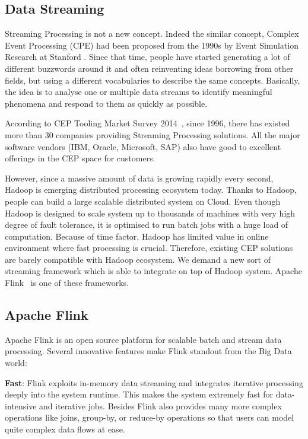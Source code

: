 \subsection*{Data Streaming}
Streaming Processing is not a new concept. Indeed the similar concept, Complex Event Processing (CPE) had been proposed from the 1990s by Event Simulation Research at Stanford \citep{Luckham:2001}. Since that time, people have started generating a lot of different buzzwords around it and often reinventing ideas borrowing from other fields, but using a different vocabularies to describe the same concepts. Basically, the idea is to analyse one or multiple data streams to identify meaningful phenomena and respond to them as quickly as possible. 


According to CEP Tooling Market Survey 2014~\citep{Paul:2014}, since 1996, there has existed more than 30 companies providing Streaming Processing solutions. All the major software vendors (IBM, Oracle, Microsoft, SAP) also have good to excellent offerings in the CEP space for customers. 


However, since a massive amount of data is growing rapidly every second, Hadoop is emerging distributed processing ecosystem today. Thanks to Hadoop, people can build a large scalable distributed system on Cloud. Even though Hadoop is designed to scale system up to thousands of machines with very high degree of fault tolerance, it is optimised to run batch jobs with a huge load of computation. Because of time factor, Hadoop has limited value in online environment where fast processing is crucial. Therefore, existing CEP solutions are barely compatible with Hadoop ecosystem.  We demand a new sort of streaming framework which is able to integrate on top of Hadoop system. Apache Flink~\citep{flink} is one of these frameworks.


\subsection*{Apache Flink}

Apache Flink is an open source platform for scalable batch and stream data processing. Several innovative features make Flink standout from the Big Data world:

\textbf{Fast}: Flink exploits in-memory data streaming and integrates iterative processing deeply into the system runtime. This makes the system extremely fast for data-intensive and iterative jobs. Besides Flink also provides many more complex operations like joins, group-by, or reduce-by operations so that users can model quite complex data flows at ease.

